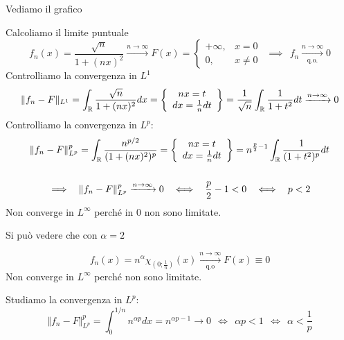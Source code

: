 Vediamo il grafico


Calcoliamo il limite puntuale
\begin{equation*}
f_{n} (x) = \frac{\sqrt{n}}{1 + (nx)^{2}}\xrightarrow{n\rightarrow \infty } F(x) = 
\begin{cases}
+ \infty , & x = 0\\
0, & x\neq 0
\end{cases} \ \ \implies \ \ f_{n}\xrightarrow[\text{q.o.}]{n\rightarrow \infty } 0
\end{equation*}
Controlliamo la convergenza in $L^{1}$
\begin{equation*}
\Vert f_{n} - F\Vert _{L^{1}} = \int _{\mathbb{R} }\frac{\sqrt{n}}{1 + (nx)^{2}} dx = \left\{
\begin{array}{ c }
nx = t\\
dx = \frac{1}{n} dt
\end{array}\right\} = \frac{1}{\sqrt{n}}\int _{\mathbb{R} }\frac{1}{1 + t^{2}} dt\xrightarrow{n\rightarrow \infty } 0
\end{equation*}
Controlliamo la convergenza in $L^{p}$:
\begin{gather*}
\Vert f_{n} - F\Vert ^{p}_{L^{p}} = \int _{\mathbb{R} }\frac{n^{p/2}}{(1 + (nx)^{2})^{p}} = \left\{
\begin{array}{ c }
nx = t\\
dx = \frac{1}{n} dt
\end{array}\right\} = n^{\frac{p}{2} - 1}\int _{\mathbb{R} }\frac{1}{(1 + t^{2})^{p}} dt\\
\\
\implies \ \ \Vert f_{n} - F\Vert ^{p}_{L^{p}}\xrightarrow{n\rightarrow \infty } 0\ \ \iff \ \ \frac{p}{2} - 1 < 0\ \ \iff \ \ p < 2
\end{gather*}
Non converge in $L^{\infty }$ perché in $0$ non sono limitate.
\Soluzione

Si può vedere che con $\alpha = 2$

\begin{equation*}
f_{n} (x) = n^{\alpha } \chi _{\left(0;\frac{1}{n}\right)} (x)\xrightarrow[\text{q.o}]{n\rightarrow \infty } F(x)\equiv 0
\end{equation*}
Non converge in $L^{\infty }$ perché non sono limitate.

Studiamo la convergenza in $L^{p}$:
\begin{equation*}
\Vert f_{n} - F\Vert ^{p}_{L^{p}} = \int ^{1/n}_{0} n^{\alpha p} dx = n^{\alpha p - 1}\rightarrow 0\ \ \iff \ \ \alpha p < 1\ \ \iff \ \ \alpha < \frac{1}{p}
\end{equation*}
\Soluzione

